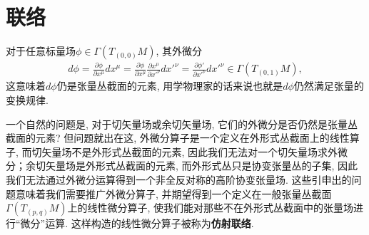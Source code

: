 \section{联络}

对于任意标量场$\phi\in \varGamma(T_{(0, 0)}M)$, 其外微分
\begin{eqnarray}
  d\phi=\frac{\partial\phi}{\partial x^\mu}dx^\mu=\frac{\partial\phi}{\partial {x}^\mu}\frac{\partial{x}^\mu}{\partial {x'}^\nu}d{x'}^\nu=\frac{\partial{\phi'}}{\partial {x'}^\nu}d{x'}^\nu\in \varGamma(T_{(0, 1)}M),
\end{eqnarray}
这意味着$d\phi$仍是张量丛截面的元素, 用学物理家的话来说也就是$d\phi$仍然满足张量的变换规律.

一个自然的问题是, 对于切矢量场或余切矢量场, 它们的外微分是否仍然是张量丛截面的元素? 但问题就出在这, 外微分算子是一个定义在外形式丛截面上的线性算子, 而切矢量场不是外形式丛截面的元素, 因此我们无法对一个切矢量场求外微分；余切矢量场是外形式丛截面的元素, 而外形式丛只是协变张量丛的子集, 因此我们无法通过外微分运算得到一个非全反对称的高阶协变张量场. 这些引申出的问题意味着我们需要推广外微分算子, 并期望得到一个定义在一般张量丛截面$\varGamma(T_{(p, q)}M)$上的线性微分算子, 使我们能对那些不在外形式丛截面中的张量场进行“微分”运算. 这样构造的线性微分算子被称为\textbf{仿射联络}.

